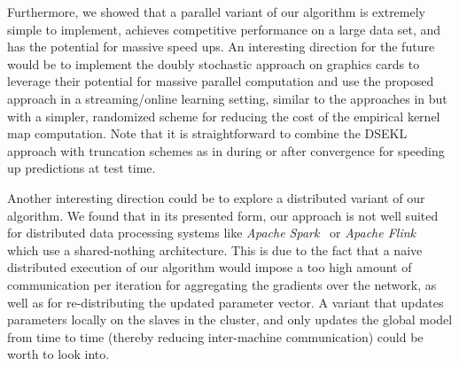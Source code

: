 \documentclass{article} %
\begin{document}
Furthermore, we showed that a parallel variant of our algorithm is extremely simple to implement, achieves competitive performance on a large data set, and has the potential for massive speed ups. An interesting direction for the future would be to implement the doubly stochastic approach on graphics cards to leverage their potential for massive parallel computation and use the proposed approach in a streaming/online learning setting, similar to the approaches in \cite{Kivinen2004, Dekel2008} but with a simpler, randomized scheme for reducing the cost of the empirical kernel map computation. Note that it is straightforward to combine the DSEKL approach with truncation schemes as in \cite{Kivinen2004, Dekel2008} during or after convergence for speeding up predictions at test time.

Another interesting direction could be to explore a distributed variant of our algorithm. We found that in its presented form, our approach is not well suited for distributed data processing systems like \textit{Apache Spark}~\cite{Zaharia2012} or \textit{Apache Flink}~\cite{Alexandrov2014} which use a shared-nothing architecture. This is due to the fact that a naive distributed execution of our algorithm would impose a too high amount of communication per iteration for aggregating the gradients over the network, as well as for re-distributing the updated parameter vector. A variant that updates parameters locally on the slaves in the cluster, and only updates the global model from time to time (thereby reducing inter-machine communication) could be worth to look into. 

\newpage

{\small
  
  }
\end{document}

